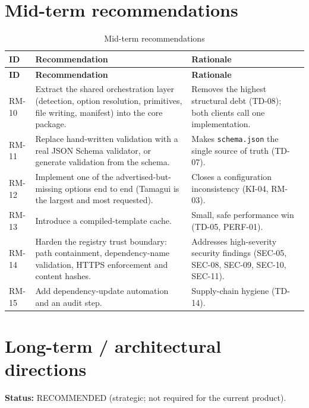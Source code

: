 \section{Mid-term recommendations}

\begin{longtable}{@{}L{1.4cm}L{5.4cm}L{8.4cm}@{}}
\caption{Mid-term recommendations}\\
\toprule
\textbf{ID} & \textbf{Recommendation} & \textbf{Rationale} \\
\midrule
\endfirsthead
\toprule
\textbf{ID} & \textbf{Recommendation} & \textbf{Rationale} \\
\midrule
\endhead
RM-10 & Extract the shared orchestration layer (detection, option resolution,
primitives, file writing, manifest) into the core package. & Removes the highest
structural debt (TD-08); both clients call one implementation. \\
RM-11 & Replace hand-written validation with a real JSON Schema validator, or
generate validation from the schema. & Makes \texttt{schema.json} the single
source of truth (TD-07). \\
RM-12 & Implement one of the advertised-but-missing options end to end (Tamagui
is the largest and most requested). & Closes a configuration inconsistency
(KI-04, RM-03). \\
RM-13 & Introduce a compiled-template cache. & Small, safe performance win
(TD-05, PERF-01). \\
RM-14 & Harden the registry trust boundary: path containment, dependency-name
validation, HTTPS enforcement and content hashes. & Addresses high-severity
security findings (SEC-05, SEC-08, SEC-09, SEC-10, SEC-11). \\
RM-15 & Add dependency-update automation and an audit step. & Supply-chain hygiene
(TD-14). \\
\bottomrule
\end{longtable}

\section{Long-term / architectural directions}

\textbf{Status:} RECOMMENDED (strategic; not required for the current product).

